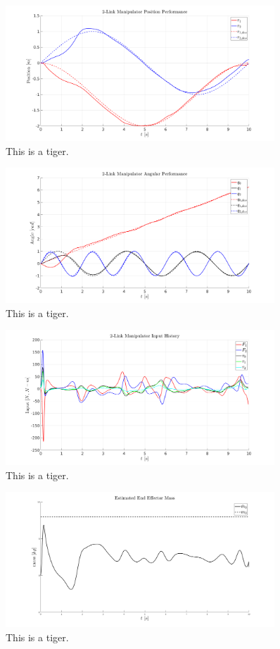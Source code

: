 \documentclass[letterpaper, 10 pt, conference]{ieeeconf}  %
\begin{document}
\begin{figure}[]
	\centering
	\includegraphics[width=0.9\textwidth]{ad_pos_2.png}
	\caption{This is a tiger.}
\end{figure}
\begin{figure}[]
	\centering
	\includegraphics[width=0.9\textwidth]{ad_ang_2.png}
	\caption{This is a tiger.}
\end{figure}

\begin{figure}[]
	\centering
	\includegraphics[width=0.9\textwidth]{ad_u_2.png}
	\caption{This is a tiger.}
\end{figure}
\begin{figure}[]
	\centering
	\includegraphics[width=0.9\textwidth]{ad_m_2.png}
	\caption{This is a tiger.}
\end{figure}
\end{document}
